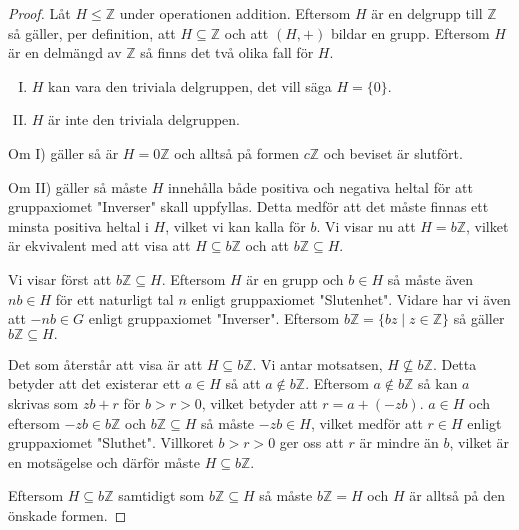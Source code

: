 \documentclass{article}
\theoremstyle{definition}
\begin{document}
\begin{proof}
  Låt $H \le \mathbb{Z}$ under operationen addition. 
  Eftersom $H$ är en delgrupp till $\mathbb{Z}$ så gäller, per definition, att 
  $H \subseteq \mathbb{Z}$ och att $(H, +)$ bildar en grupp. 
  Eftersom $H$ är en delmängd av $\mathbb{Z}$ så finns det två olika fall för $H$.
  \begin{enumerate}[I)]
    \item $H$ kan vara den triviala delgruppen, det vill säga $H = \{0\}$. 
    \item $H$ är inte den triviala delgruppen.
  \end{enumerate}
  Om I) gäller så är $H = 0 \mathbb{Z}$ och alltså på formen $c \mathbb{Z}$ och beviset är 
  slutfört.
  
  Om II) gäller så måste $H$ innehålla både positiva och negativa heltal för att 
  gruppaxiomet "Inverser" skall uppfyllas. Detta medför att det måste finnas 
  ett minsta positiva heltal i $H$, vilket vi kan kalla för $b$.
  Vi visar nu att $H = b \mathbb{Z}$, 
  vilket är ekvivalent med att visa att $H \subseteq b \mathbb{Z}$
  och att $b \mathbb{Z} \subseteq H.$

  Vi visar först att $b \mathbb{Z} \subseteq H.$   
  Eftersom $H$ är en grupp och $b \in H$ så måste 
  även $nb \in H$ för ett naturligt tal $n$ enligt gruppaxiomet "Slutenhet". 
  Vidare har vi även att $-nb \in G$ enligt gruppaxiomet "Inverser".
  Eftersom 
  $b \mathbb{Z} = \{bz \; | \; z \in \mathbb{Z}\}$ så gäller $b \mathbb{Z} \subseteq H.$

  Det som återstår att visa är att $H \subseteq b \mathbb{Z}$. Vi antar motsatsen, 
  $H \not\subseteq b \mathbb{Z}$. Detta betyder att det existerar ett 
  $a \in H$ så att $a \notin b\mathbb{Z}.$ Eftersom $a \notin b\mathbb{Z}$ så 
  kan $a$ skrivas som $zb + r$ för $b > r > 0$, vilket betyder 
  att $r = a + (-zb)$. $a \in H$ och eftersom $-zb \in b \mathbb{Z}$ och $b \mathbb{Z} \subseteq H$ 
  så måste
  $-zb \in H$, vilket medför att $r \in H$ enligt gruppaxiomet "Sluthet". Villkoret $b > r > 0$ ger oss att $r$ är mindre än $b$, vilket är en motsägelse och därför 
  måste $H \subseteq b \mathbb{Z}$.
  
  Eftersom $H \subseteq b \mathbb{Z}$ samtidigt som $b \mathbb{Z} \subseteq H$ så måste 
  $b \mathbb{Z} = H$ och $H$ är alltså på den önskade formen.
\end{proof}



\end{document}
